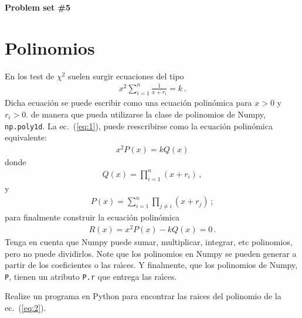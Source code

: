 \documentclass[12pt]{article}
\begin{document}
\noindent{}\hrulefill{}
\begin{flushright}
  \textbf{\large{Problem set \#5}}
\end{flushright}
\tableofcontents{}
\noindent{}\hrulefill{}
\section{Polinomios}
En los test de $\chi^2$ suelen surgir ecuaciones del tipo
\begin{align}
\label{eq:1}
  x^2\sum_{i=1}^n\frac{1}{x+r_i}=k\,.
\end{align}
Dicha ecuaci\'on se puede escribir como una ecuaci\'on polin\'omica para $x>0$ y $r_i>0$. de manera que pueda utilizarse la clase de polinomios de Numpy, \texttt{np.poly1d}. La ec.~(\ref{eq:1}), puede reescribirse como la ecuaci\'on polin\'omica equivalente:
\begin{align}
  x^2P(x)=k Q(x)
\end{align}
donde
\begin{align}
  Q(x)=\prod_{i=1}^n(x+r_i)\,,
\end{align}
y
\begin{align}
  P(x)=\sum_{i=1}^n\prod_{j\neq i}(x+r_j)\,;
\end{align}
para finalmente construir la ecuaci\'on polin\'omica
\begin{align}
  R(x)= x^2P(x)-k Q(x)=0\,.
  \label{eq:2}
\end{align}
Tenga en cuenta que Numpy puede sumar, multiplicar, integrar, etc polinomios, pero no puede dividirlos. Note que los polinomios en Numpy se pueden generar a partir de los coeficientes o las ra\'\i ces. Y finalmente, que  los polinomios de Numpy, \texttt{P}, tienen un atributo \texttt{P.r} que entrega las ra\'\i ces. 

Realize un programa en Python para encontrar las raices del polinomio de la ec.~(\ref{eq:2}).
\end{document}
